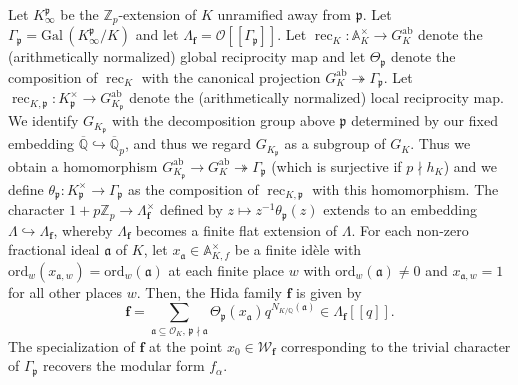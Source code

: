 \documentclass[a4paper,11pt]{amsart}
\theoremstyle{plain}
\theoremstyle{definition}
\theoremstyle{remark}
\newcommand{\bb}{\mathbb}
\newcommand{\frk}{\mathfrak}
\newcommand{\cl}{\mathcal}
\DeclareMathOperator{\rec}{rec}
\DeclareMathOperator{\ab}{ab}
\newcommand{\Gal}{\mathrm{Gal\,}}
\newcommand{\ord}{{\mathrm{ord}}}
\newcommand{\hf}{{\mathbf{f}}}
\numberwithin{equation}{section}
\begin{document}

Let $K^{\frk{p}}_{\infty}$ be the $\bb{Z}_p$-extension of $K$ unramified away from $\frk{p}$. Let $\Gamma_{\frk{p}}=\Gal(K^{\frk{p}}_{\infty}/K)$ and let $\Lambda_\hf=\cl{O}[[\Gamma_{\frk{p}}]]$. Let $\rec_K:\bb{A}_K^\times\rightarrow G_K^{\ab}$ denote the (arithmetically normalized) global reciprocity map and let $\Theta_\frk{p}$ denote the composition of $\rec_K$ with the canonical projection $G_K^{\ab} \twoheadrightarrow \Gamma_{\frk{p}}$. Let $\rec_{K,\frk{p}}:K_{\frk{p}}^\times \rightarrow G_{K_{\frk{p}}}^{\ab}$ denote the (arithmetically normalized) local reciprocity map. We identify $G_{K_\frk{p}}$ with the decomposition group above $\frk{p}$ determined by our fixed embedding $\overline{\bb{Q}}\hookrightarrow \overline{\bb{Q}}_p$, and thus we regard $G_{K_\frk{p}}$ as a subgroup of $G_K$. Thus we obtain a homomorphism $G_{K_\frk{p}}^{\ab} \rightarrow G_K^{\ab} \twoheadrightarrow \Gamma_{\frk{p}}$ (which is surjective if $p\nmid h_K$) and we define $\theta_\frk{p}:K_\frk{p}^\times\rightarrow \Gamma_{\frk{p}}$ as the composition of $\rec_{K,\frk{p}}$ with this homomorphism. The character $1+p\bb{Z}_p\rightarrow \Lambda_{\hf}^\times$ defined by $z\mapsto z^{-1}\theta_{\frk{p}}(z)$ extends to an embedding $\Lambda\hookrightarrow \Lambda_{\hf}$, whereby $\Lambda_{\hf}$ becomes a finite flat extension of $\Lambda$. For each non-zero fractional ideal $\frk{a}$ of $K$, let $x_\frk{a}\in \bb{A}_{K,f}^\times$ be a finite id\`ele with $\ord_w(x_{\frk{a},w})=\ord_w(\frk{a})$ at each finite place $w$ with $\ord_w(\frk{a})\neq 0$ and $x_{\frk{a},w}=1$ for all other places $w$. Then, the Hida family $\hf$ is given by
\[
\hf=\sum_{\frk{a}\subseteq \cl{O}_K,\,\frk{p}\nmid\frk{a}}\Theta_\frk{p}(x_\frk{a}) q^{N_{K/\bb{Q}}(\frk{a})} \in \Lambda_\hf[[q]].
\]
The specialization of $\hf$ at the point $x_0\in \cl{W}_{\hf}$ corresponding to the trivial character of $\Gamma_{\frk{p}}$ recovers the modular form $f_\alpha$.
\end{document}
